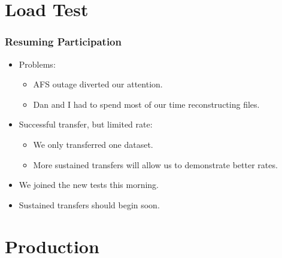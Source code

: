\documentclass{beamer}
\begin{document}
\section{Load Test}
\begin{frame}
    \frametitle{Resuming Participation}
    \begin{itemize}
        \item Problems:
        \begin{itemize}
            \item AFS outage diverted our attention.
            \item Dan and I had to spend most of our time reconstructing files.
        \end{itemize}
        \item Successful transfer, but limited rate:
        \begin{itemize}
            \item We only transferred one dataset.
            \item More sustained transfers will allow us to demonstrate better rates.
        \end{itemize}
        \item We joined the new tests this morning.
        \item Sustained transfers should begin soon.
    \end{itemize}
\end{frame}

\section{Production}
\begin{frame}
    \frametitle{}
\end{frame}
\end{document}
